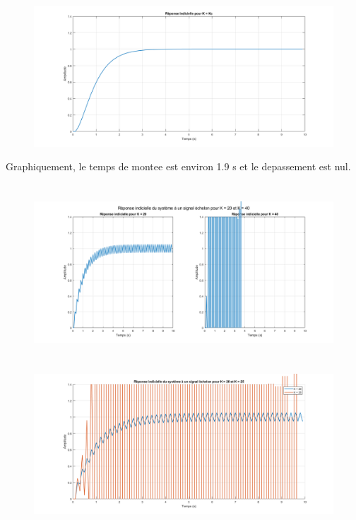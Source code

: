 \documentclass[14pt]{extarticle}
\begin{document}
\section{}
\begin{figure}[tbh]
\vspace{0.1cm}
    \centering
    \includegraphics[width=\columnwidth]{tp2_13.png}
    \footnotesize
    \vspace{\baselineskip}
\end{figure}
Graphiquement, le temps de montee est environ 1.9 s et le depassement est nul.
\break


\section{}
\begin{figure}[tbh]
\vspace{0.1cm}
    \centering
    \includegraphics[width=\columnwidth]{tp2_14.png}
    \footnotesize
    \vspace{\baselineskip}
\end{figure}

\break
\section{}
\begin{figure}[tbh]
\vspace{0.1cm}
    \centering
    \includegraphics[width=\columnwidth]{tp2_15.png}
    \footnotesize
    \vspace{\baselineskip}
\end{figure}
\end{document}
